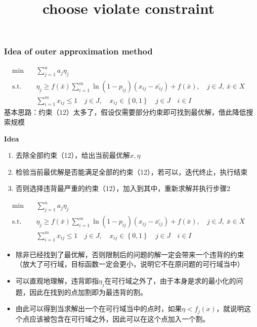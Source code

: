 \documentclass[10pt]{beamer}
\begin{document}
\begin{frame}
    \frametitle{Idea of outer approximation method}
    {
    \scriptsize
    \begin{align*}
        \min\quad & \sum_{j=1}^n a_j \eta_j \\ 
        \mathrm{s. t.}\quad & \eta_j \geq f(\bar{x})\sum_{i = 1}^m \ln(1-p_{ij})(x_{ij} - \bar{x_{ij}}) + f(\bar{x}), \quad j \in J,\ \bar{x} \in X \\ 
        &\sum_{i=1}^m x_{ij} \leq 1\quad j \in J,\quad x_{ij} \in \left\{ 0,1 \right\} \quad j\in J\quad i \in I
    \end{align*}
    基本思路：约束（12）太多了，假设仅需要部分约束即可找到最优解，借此降低搜索规模

    \textbf{Idea}
    \begin{enumerate}
        \item 去除全部约束（12），给出当前最优解$x, \eta$
        \item 检验当前最优解是否能满足全部的约束（12），若可以，迭代终止，执行结束
        \item 否则选择违背最严重的约束（12），加入到其中，重新求解并执行步骤2
    \end{enumerate}
    }
\end{frame}

\begin{frame}
    \title{choose violate constraint}
    \begin{align*}
        \min\quad & \sum_{j=1}^n a_j \eta_j \\ 
        \mathrm{s. t.}\quad & \eta_j \geq f(\bar{x})\sum_{i = 1}^m \ln(1-p_{ij})(x_{ij} - \bar{x_{ij}}) + f(\bar{x}), \quad j \in J,\ \bar{x} \in X \\ 
        &\sum_{i=1}^m x_{ij} \leq 1\quad j \in J,\quad x_{ij} \in \left\{ 0,1 \right\} \quad j\in J\quad i \in I
    \end{align*}
    \begin{itemize}
        \item 除非已经找到了最优解，否则限制后的问题的解一定会带来一个违背的约束（放大了可行域，目标函数一定会更小，说明它不在原问题的可行域当中）
        \item 可以直观地理解，违背即指$\eta_j$在可行域之外了，由于本身是求的最小化的问题，因此在找到的点加割即为最违背的割。
        \item 由此可以得到当求解出一个在可行域当中的点时，如果$\eta < f_j(x)$，就说明这个点应该被包含在可行域之外，因此可以在这个点加入一个割。
    \end{itemize}
\end{frame}
\end{document}
